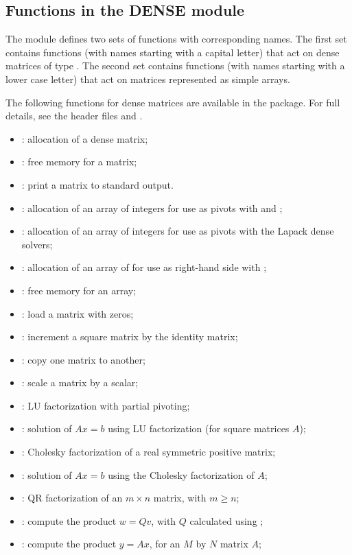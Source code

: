 \subsection{Functions in the DENSE module}\label{ss:dense}

The {\dense} module defines two sets of functions with corresponding names.
The first set contains functions (with names starting with a capital letter)
that act on dense matrices of type .  The second set contains functions
(with names starting with a lower case letter) that act on matrices represented 
as simple arrays.

The following functions for  dense matrices are available
in the {\dense} package.  For full details, see the header files
 and .
\begin{itemize}
\item {}: allocation of a  dense matrix;
\item {}: free memory for a  matrix;
\item {}: print a  matrix to standard output.
\item {}: allocation of an array of integers for use
  as pivots with  and ;
\item {}: allocation of an array of  integers for use
  as pivots with the Lapack dense solvers;
\item {}: allocation of an array of  for use
  as right-hand side with ;
\item {}: free memory for an array;
\item {}: load a matrix with zeros;
\item {}: increment a square matrix by the identity matrix;
\item {}: copy one matrix to another;
\item {}: scale a matrix by a scalar;
\item {}: LU factorization with partial pivoting;
\item {}: solution of $Ax = b$ using LU factorization (for square matrices $A$);
\item {}: Cholesky factorization of a real symmetric positive matrix;
\item {}: solution of $Ax = b$ using the Cholesky factorization of $A$;
\item {}: QR factorization of an $m \times n$ matrix, with $m \ge n$;
\item {}: compute the product $w = Qv$, with $Q$ calculated using ;
\item {}: compute the product $y = Ax$, for an $M$ by $N$ matrix $A$;
\end{itemize}
